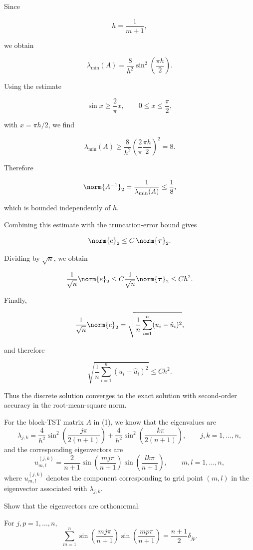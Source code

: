 \documentclass{ctexart}
\begin{document}
\begin{solution}
  Since

  \[
    h=\frac1{m+1},
  \]

  we obtain

  \[
    \lambda_{\min}(A)
    =
    \frac8{h^2}
    \sin^2
    \left(\frac{\pi h}{2}\right).
  \]

  Using the estimate

  \[
    \sin x \ge \frac{2}{\pi}x,
    \qquad
    0\le x\le \frac{\pi}{2},
  \]

  with \(x=\pi h/2\), we find

  \[
    \lambda_{\min}(A)
    \ge
    \frac8{h^2}
    \left(\frac{2}{\pi}\frac{\pi h}{2}\right)^2
    =
    8 .
  \]

  Therefore

  \[
    \norm{A^{-1}}_2
    =
    \frac1{\lambda_{\min}(A)}
    \le
    \frac18 ,
  \]

  which is bounded independently of \(h\).

  Combining this estimate with the truncation-error bound gives

  \[
    \norm{e}_2
    \le
    C\,\norm{\boldsymbol\tau}_2 .
  \]

  Dividing by \(\sqrt n\), we obtain

  \[
    \frac1{\sqrt n}\norm{e}_2
    \le
    C
    \frac1{\sqrt n}
    \norm{\boldsymbol\tau}_2
    \le
    C h^2 .
  \]

  Finally,

  \[
    \frac1{\sqrt n}\norm{e}_2
    =
    \sqrt{
      \frac1n
      \sum_{i=1}^n
      (u_i-\hat u_i)^2
    },
  \]

  and therefore

  \[
    \boxed{
      \sqrt{
        \frac1n
        \sum_{i=1}^n
        (u_i-\hat u_i)^2
      }
      \le
      C h^2 .
    }
  \]

  Thus the discrete solution converges to the exact solution with
  second-order accuracy in the root-mean-square norm.

\end{solution}
\begin{problem}\label{pro:3}
  For the block-TST matrix $A$ in (1), we know that the eigenvalues are
  \[
    \lambda_{j,k}
    =
    \frac{4}{h^2}
    \sin^2\!\left(
      \frac{j\pi}{2(n+1)}
    \right)
    +
    \frac{4}{h^2}
    \sin^2\!\left(
      \frac{k\pi}{2(n+1)}
    \right),
    \qquad
    j,k=1,\ldots,n,
  \]
  and the corresponding eigenvectors are
  \[
    u_{m,l}^{(j,k)}
    =
    \frac{2}{n+1}
    \sin\!\left(
      \frac{mj\pi}{n+1}
    \right)
    \sin\!\left(
      \frac{lk\pi}{n+1}
    \right),
    \qquad
    m,l=1,\ldots,n,
  \]
  where $u_{m,l}^{(j,k)}$ denotes the component corresponding to grid point
  $(m,l)$ in the eigenvector associated with $\lambda_{j,k}$.

  Show that the eigenvectors are orthonormal.
\end{problem}
\begin{lemma}
  For $j,p=1,\ldots,n$,
  \[
    \sum_{m=1}^{n}
    \sin\left(\frac{mj\pi}{n+1}\right)
    \sin\left(\frac{mp\pi}{n+1}\right)
    =
    \frac{n+1}{2}\delta_{jp}.
  \]
\end{lemma}
\end{document}
